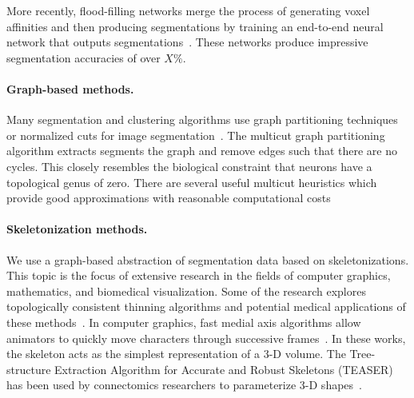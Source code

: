 More recently, flood-filling networks merge the process of generating voxel affinities and then producing segmentations by training an end-to-end neural network that outputs segmentations~\cite{januszewski2016flood}. 
These networks produce impressive segmentation accuracies of over $X\%$.%

\paragraph{Graph-based methods.} Many segmentation and clustering algorithms use graph partitioning techniques~\cite{andres2012globally} or normalized cuts for image segmentation~\cite{kappes2016higher,shi2000normalized,tatiraju2008image}. 
The multicut graph partitioning algorithm extracts segments the graph and remove edges such that there are no cycles. 
This closely resembles the biological constraint that neurons have a topological genus of zero. 
There are several useful multicut heuristics which provide good approximations with reasonable computational costs~\cite{horvnakova2017analysis,kernighan1970efficient,keuper2015efficient}

\paragraph{Skeletonization methods.} We use a graph-based abstraction of segmentation data based on skeletonizations. 
This topic is the focus of extensive research in the fields of computer graphics, mathematics, and biomedical visualization.
Some of the research explores topologically consistent thinning algorithms and potential medical applications of these methods~\cite{palagyi20003d,palagyi2001sequential}. 
In computer graphics, fast medial axis algorithms allow animators to quickly move characters through successive frames~\cite{baran2007automatic,bharaj2012automatically}. 
In these works, the skeleton acts as the simplest representation of a 3-D volume. 
The Tree-structure Extraction Algorithm for Accurate and Robust Skeletons (TEASER) has been used by connectomics researchers to parameterize 3-D shapes~\cite{sato2000teasar,zhao2014automatic}. 


